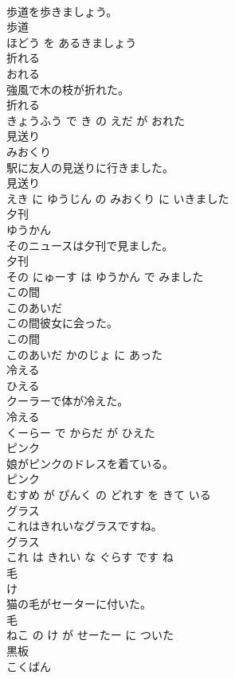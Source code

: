 \documentclass[8pt]{extreport}
\begin{document}
\begin{CJK}{UTF8}{min}
\\	歩道を歩きましょう。	
\\	歩道 
\\	ほどう を あるきましょう			
\\	折れる	
\\	おれる			
\\	強風で木の枝が折れた。	
\\	折れる 
\\	きょうふう で き の えだ が おれた			
\\	見送り	
\\	みおくり			
\\	駅に友人の見送りに行きました。	
\\	見送り 
\\	えき に ゆうじん の みおくり に いきました			
\\	夕刊	
\\	ゆうかん			
\\	そのニュースは夕刊で見ました。	
\\	夕刊 
\\	その にゅーす は ゆうかん で みました			
\\	この間	
\\	このあいだ			
\\	この間彼女に会った。	
\\	この間 
\\	このあいだ かのじょ に あった			
\\	冷える	
\\	ひえる			
\\	クーラーで体が冷えた。	
\\	冷える 
\\	くーらー で からだ が ひえた			
\\	ピンク	
\\	娘がピンクのドレスを着ている。	
\\	ピンク 
\\	むすめ が ぴんく の どれす を きて いる			
\\	グラス	
\\	これはきれいなグラスですね。	
\\	グラス 
\\	これ は きれい な ぐらす です ね			
\\	毛	
\\	け			
\\	猫の毛がセーターに付いた。	
\\	毛 
\\	ねこ の け が せーたー に ついた			
\\	黒板	
\\	こくばん			

\end{CJK}
\end{document}
